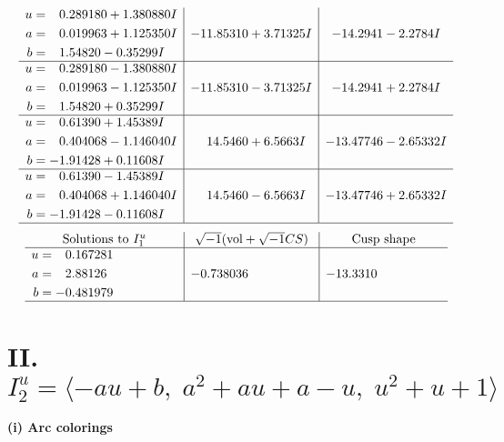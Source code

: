 \documentclass[1p]{elsarticle_modified}
\theoremstyle{definition}
\newcommand{\I}{\sqrt{-1}}
\begin{document}
$$\begin{array}{c|c|c}
\begin{aligned}
u &= \phantom{-}0.289180 + 1.380880 I \\
a &= \phantom{-}0.019963 + 1.125350 I \\
b &= \phantom{-}1.54820 - 0.35299 I\end{aligned}
 & -11.85310 + 3.71325 I & -14.2941 - 2.2784 I \\ \hline\begin{aligned}
u &= \phantom{-}0.289180 - 1.380880 I \\
a &= \phantom{-}0.019963 - 1.125350 I \\
b &= \phantom{-}1.54820 + 0.35299 I\end{aligned}
 & -11.85310 - 3.71325 I & -14.2941 + 2.2784 I \\ \hline\begin{aligned}
u &= \phantom{-}0.61390 + 1.45389 I \\
a &= \phantom{-}0.404068 - 1.146040 I \\
b &= -1.91428 + 0.11608 I\end{aligned}
 & \phantom{-}14.5460 + 6.5663 I & -13.47746 - 2.65332 I \\ \hline\begin{aligned}
u &= \phantom{-}0.61390 - 1.45389 I \\
a &= \phantom{-}0.404068 + 1.146040 I \\
b &= -1.91428 - 0.11608 I\end{aligned}
 & \phantom{-}14.5460 - 6.5663 I & -13.47746 + 2.65332 I\\
 \hline 
 \end{array}$$\newpage$$\begin{array}{c|c|c}  
\text{Solutions to }I^u_{1}& \I (\text{vol} + \sqrt{-1}CS) & \text{Cusp shape}\\
 \hline 
\begin{aligned}
u &= \phantom{-}0.167281\phantom{ +0.000000I} \\
a &= \phantom{-}2.88126\phantom{ +0.000000I} \\
b &= -0.481979\phantom{ +0.000000I}\end{aligned}
 & -0.738036\phantom{ +0.000000I} & -13.3310\phantom{ +0.000000I}\\
 \hline 
 \end{array}$$\newpage\newpage\renewcommand{\arraystretch}{1}
\centering \section*{II. $I^u_{2}= \langle - a u+b,\;a^2+a u+a- u,\;u^2+u+1 \rangle$}
\flushleft \textbf{(i) Arc colorings}\\
\end{document}
